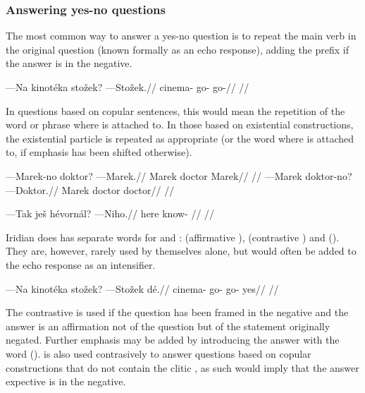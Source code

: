 \subsubsection{Answering yes-no questions}
The most common way to answer a yes-no question is to repeat the main verb in the original question (known formally as an echo response), adding the prefix  if the answer is in the negative.

\pex
\begingl
\gla ---Na kinot\'eka sto\v{z}ek? ---Sto\v{z}ek.//
\glb {} cinema- go- go-//
\glft {}//
\endgl
\xe

In questions based on copular sentences, this would mean the repetition of the word or phrase where  is attached to. In those based on existential constructions, the existential particle is repeated as appropriate (or the word where  is attached to, if emphasis has been shifted otherwise).

\pex
\a
\begingl
\gla ---Marek-no doktor? ---Marek.//
\glb Marek doctor Marek//
\glft {}//
\endgl
\a
\begingl
\gla ---Marek doktor-no? ---Doktor.//
\glb Marek doctor doctor//
\glft {}//
\endgl
\xe

\pex
\begingl
\gla ---Tak je\v{s} h\'evorn\'al? ---Niho.//
\glb here  know- //
\glft {}//
\endgl
\xe

Iridian does has separate words for  and :  (affirmative ),  (contrastive ) and  (). They are, however, rarely used by themselves alone, but would often be added to the echo response as an intensifier.

\pex
\begingl
\gla ---Na kinot\'eka sto\v{z}ek? ---Sto\v{z}ek d\'e.//
\glb {} cinema- go- go- yes//
\glft {}//
\endgl
\xe

The contrastive  is used if the question has been framed in the negative and the answer  is an affirmation not of the question but of the statement originally negated. Further emphasis may be added by introducing the answer with the word  ().  is also used contrasively to answer questions based on copular constructions that do not contain the clitic , as such would imply that the answer expective is in the negative.

